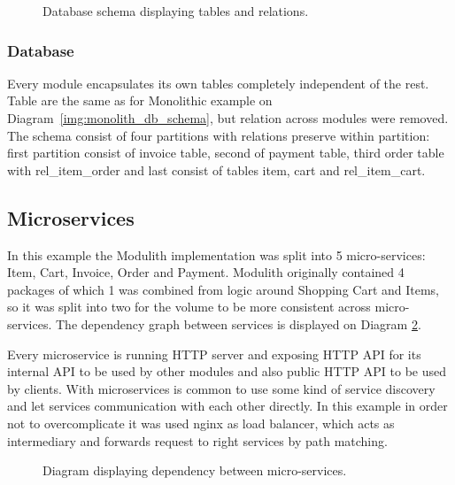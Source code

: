 \begin{figure}
    \centering
    
    \caption{Database schema displaying tables and relations. \label{img:modulith_package}}
\end{figure}

\subsubsection{Database}
Every module encapsulates its own tables completely independent of the rest. Table are the same as for Monolithic example on Diagram~\ref{img:monolith_db_schema}, but relation across modules were removed. The schema consist of four partitions with relations preserve within partition: first partition consist of invoice table, second of payment table, third order table with rel\_item\_order and last consist of tables item, cart and rel\_item\_cart.


\subsection{Microservices}
In this example the Modulith implementation was split into 5 micro-services: Item, Cart, Invoice, Order and Payment. Modulith originally contained 4 packages of which 1 was combined from logic around Shopping Cart and Items, so it was split into two for the volume to be more consistent across micro-services. The dependency graph between services is displayed on Diagram \ref{img:microservices_dependency}.

Every microservice is running HTTP server and exposing HTTP API for its internal API to be used by other modules and also public HTTP API to be used by clients. With microservices is common to use some kind of service discovery and let services communication with each other directly. In this example in order not to overcomplicate it was used nginx as load balancer, which acts as intermediary and forwards request to right services by path matching.

\begin{figure}
    \centering
    
    \caption{Diagram displaying dependency between micro-services. \label{img:microservices_dependency}}
\end{figure}

